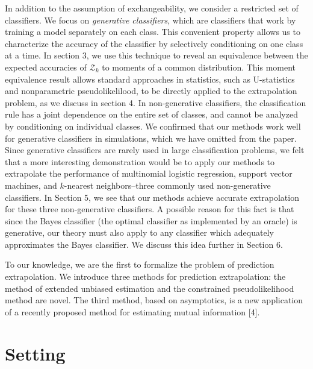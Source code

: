 \documentclass{article}
\begin{document}
In addition to the assumption of exchangeability, we consider a restricted set of classifiers.
We focus on \emph{generative classifiers}, which are classifiers that work by training
a model separately on each class.  This convenient property 
allows us to characterize the accuracy of the classifier by selectively conditioning on one class at a time.
In section 3, we use this technique to reveal an equivalence between 
the expected accuracies of $\mathcal{Z}_k$ to moments of a common distribution.
This moment equivalence result allows standard approaches in statistics, such as U-statistics and
nonparametric pseudolikelilood, to be directly applied to the extrapolation problem, as we discuss in section 4.
In non-generative classifiers, the classification rule has a joint dependence on the entire set of classes,
and cannot be analyzed by conditioning on individual classes.
We confirmed that our methods work well for generative classifiers in simulations, which we have omitted from
the paper.  Since generative classifiers are rarely used in large classification problems,
we felt that a more interesting demonstration would be to apply our methods to extrapolate the performance
of multinomial logistic regression, support vector machines, and $k$-nearest neighbors--three commonly used
non-generative classifiers.  In Section 5, we see that our methods achieve accurate extrapolation
for these three non-generative classifiers.  A possible reason for this fact is that since the Bayes classifier
(the optimal classifier as implemented by an oracle) is generative, our theory must also apply
to any classifier which adequately approximates the Bayes classifier.  We discuss this idea further in Section 6.

To our knowledge, we are the first to formalize the problem of prediction extrapolation.
We introduce three methods for prediction extrapolation: the method of extended unbiased estimation
and the constrained pseudolikelihood method are novel.  The third method, based
on asymptotics, is a new application of a recently proposed method 
for estimating mutual information [4].

\section{Setting}
\end{document}
